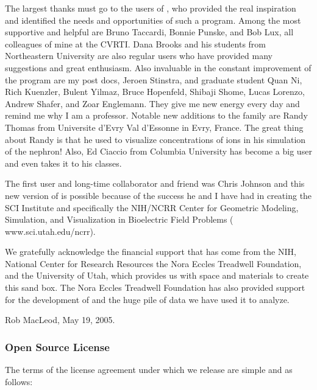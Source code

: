 The largest thanks must go to the users of \map{}, who provided the real
inspiration and identified the needs and opportunities of such a program.
Among the most supportive and helpful are Bruno Taccardi, Bonnie Punske,
and Bob Lux, all colleagues of mine at the CVRTI. Dana Brooks and his
students from Northeastern University are also regular users who have
provided many suggestions and great enthusiasm.  Also invaluable in the
constant improvement of the program are my post docs, Jeroen Stinstra, and
graduate student Quan Ni, Rich Kuenzler, Bulent Yilmaz, Bruce Hopenfeld,
Shibaji Shome, Lucas Lorenzo, Andrew Shafer, and Zoar Englemann.  They give
me new energy every day and remind me why I am a professor.  Notable new
additions to the family are Randy Thomas from Universite d'Evry Val
d'Essonne in Evry, France.  The great thing about Randy is that he used
\map{} to visualize concentrations of ions in his simulation of the
nephron!  Also, Ed Ciaccio from Columbia University has become a big user
and even takes it to his classes.

The first user and long-time collaborator and friend was Chris Johnson and
this new version of \map{} is possible because of the success he and I have
had in creating the SCI Institute and specifically the NIH/NCRR Center for
Geometric Modeling, Simulation, and Visualization in Bioelectric Field
Problems (
{www.sci.utah.edu/ncrr}).

We gratefully acknowledge the financial support that has come from the NIH,
National Center for Research Resources
 the Nora Eccles
Treadwell Foundation, and the University of Utah, which provides us with
space and materials to create this sand box.  The Nora Eccles Treadwell
Foundation has also provided support for the development of \map{} and the
huge pile of data we have used it to analyze.

\bigskip
\noindent
Rob MacLeod, May 19, 2005.


\subsubsection{Open Source License}
\label{sec:source_license}

The terms of the license agreement under which we release \map{} are simple
and as follows:

